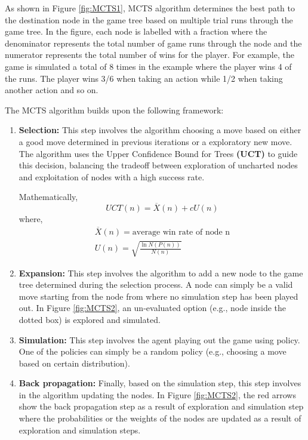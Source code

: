 As shown in Figure \ref{fig:MCTS1}, \gls{MCTS} algorithm determines the best path to the destination node in the game tree based on multiple trial runs through the game tree. In the figure, each node is labelled with a fraction where the denominator represents the total number of game runs through the node and the numerator represents the total number of wins for the player. For example, the game is simulated a total of 8 times in the example where the player wins 4 of the runs. The player wins 3/6 when taking an action while 1/2 when taking another action and so on.

The \gls{MCTS} algorithm builds upon the following framework:
\begin{enumerate}
    \item \textbf{Selection:} This step involves the algorithm choosing a move based on either a good move determined in previous iterations or a exploratory new move. The algorithm uses the Upper Confidence Bound for Trees \textbf{(UCT)} to guide this decision, balancing the tradeoff between exploration of uncharted nodes and exploitation of nodes with a high success rate.
    
    Mathematically,
    \begin{equation}
        UCT(n) = \overline{X}(n) + c U(n)
    \label{eq:UCT}
    \end{equation}
    where,
    \begin{subequations}
    \begin{align}
        \overline{X}(n) = \text{average win rate of node n} \\
        U(n) = \sqrt{\frac{\ln{N(P(n))}}{N(n)}   }
    \end{align}
    \end{subequations}
    
    
    \item \textbf{Expansion:} This step involves the algorithm to add a new node to the game tree determined during the selection process. A node can simply be a valid move starting from the node from where no simulation step has been played out. In Figure \ref{fig:MCTS2}, an un-evaluated option (e.g., node inside the dotted box) is explored and simulated.
    \item \textbf{Simulation:} This step involves the agent playing out the game using policy. One of the policies can simply be a random policy (e.g., choosing a move based on certain distribution).
    \item \textbf{Back propagation:} Finally, based on the simulation step, this step involves in the algorithm updating the nodes. In Figure \ref{fig:MCTS2}, the red arrows show the back propagation step as a result of exploration and simulation step where the probabilities or the weights of the nodes are updated as a result of exploration and simulation steps.
\end{enumerate}

